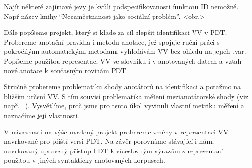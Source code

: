 \documentclass[12pt]{article}
\begin{document}
Najít některé zajímavé jevy je kvůli podspecifikovanosti funktoru ID nemožné. Např název knihy ``Nezaměstnanost jako sociální problém''. <obr.>

Dále popíšeme projekt, který si klade za cíl zlepšit identifikaci VV v PDT. Probereme anotační pravidla i metodu anotace, jež spojuje ruční práci s pokročilými automatickými metodami vyhledávání VV bez ohledu na jejich tvar. Popíšeme použitou representaci VV ve slovníku i v anotovaných datech a vztah nové anotace k současným rovinám PDT.

Stručně probereme problematiku shody anotátorů na identifikaci a potažmo na bližším určení VV. S tím souvisí %
problematika měření mezianotátorské shody (viz např. ~\citet{artstein:2007}). Vysvětlíme, proč jsme pro tento úkol vyvinuli vlastní metriku měření a naznačíme její vlastnosti.

V návaznosti na výše uvedený projekt probereme změny v representaci VV navrhované pro příští versi PDT. Na závěr porovnáme stávající i námi navrhovaný upravený přístup PDT k víceslovným výrazům s representací použitou v jiných syntakticky anotovaných korpusech.


\newcommand{\bibfont}{\small}

\end{document}
